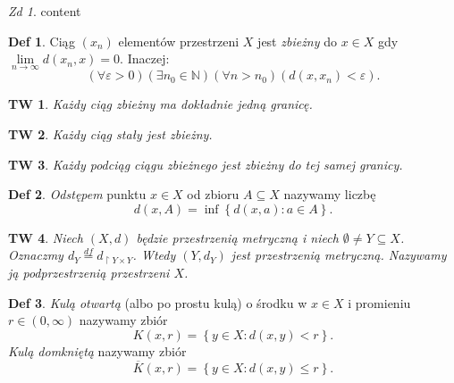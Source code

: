 \documentclass[a4paper, 12pt]{mwart}
\theoremstyle{definition}
\newtheorem{definicja}{Def}[section]
\theoremstyle{plain}
\newtheorem{twierdzenie}{TW}[section]
\theoremstyle{remark}
\newtheorem{zadanie}{Zd}[section]
\begin{document}
\begin{zadanie}
	content
\end{zadanie}
\begin{definicja}
	Ciąg $(x_n)$ elementów przestrzeni $X$ jest \emph{zbieżny} do $x\in X$ gdy $\lim\limits_{n \to \infty} d(x_n, x) = 0$. Inaczej:
	\begin{equation}
		\left(\forall \varepsilon > 0\right)\left(\exists n_0 \in \mathbb{N}\right)\left(\forall n > n_0\right)\left(d(x, x_n) < \varepsilon \right).
	\end{equation}
\end{definicja}
\begin{twierdzenie}
	Każdy ciąg zbieżny ma dokładnie jedną granicę.
\end{twierdzenie}
\begin{twierdzenie}
	Każdy ciąg stały jest zbieżny.
\end{twierdzenie}
\begin{twierdzenie}
	Każdy podciąg ciągu zbieżnego jest zbieżny do tej samej granicy.
\end{twierdzenie}
\begin{definicja}
	\emph{Odstępem} punktu $x \in X$ od %
	zbioru $A \subseteq X$ nazywamy liczbę
	\begin{equation}
		d(x, A) = \inf\left\{d(x, a)\colon a \in A\right\}.
	\end{equation}
\end{definicja}
\begin{twierdzenie}
	Niech $(X, d)$ będzie przestrzenią metryczną i niech $\emptyset \neq Y \subseteq X$. Oznaczmy $d_Y \overset{df}{=} d_{\restriction Y\times Y}$. Wtedy $(Y, d_Y)$ jest przestrzenią metryczną. Nazywamy ją \emph{podprzestrzenią przestrzeni $X$}.
\end{twierdzenie}
\begin{definicja}
	\emph{Kulą otwartą} (albo po prostu kulą) o środku w $x\in X$ i promieniu $r \in (0, \infty)$ nazywamy zbiór
	\begin{equation}
		K(x, r) = \left\{y \in X\colon d(x, y) < r\right\}.
	\end{equation}
	\emph{Kulą domkniętą} nazywamy zbiór
	\begin{equation}
		\overline K(x, r) = \left\{y\in X\colon d(x, y) \leq r\right\}.
	\end{equation}
\end{definicja}
\end{document}
